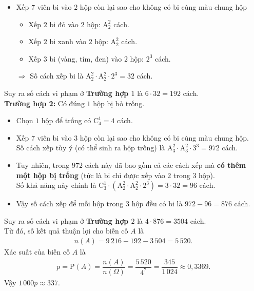 \begin{ex}
{\begin{itemize}
			\item Xếp $7$ viên bi vào $2$ hộp còn lại sao cho không có bi cùng màu chung hộp
			\begin{itemize}
				\item Xếp $2$ bi đỏ vào $2$ hộp: $\mathrm{A}_2^2$ cách.
				\item Xếp $2$ bi xanh vào $2$ hộp: $\mathrm{A}_2^2$ cách.
				\item Xếp $3$ bi (vàng, tím, đen) vào $2$ hộp: $2^3$ cách.
			\end{itemize}
			$\Rightarrow$ Số cách xếp bi là $\mathrm{A}_2^2 \cdot \mathrm{A}_2^2 \cdot 2^3 = 32$ cách.
		\end{itemize}
		Suy ra số cách vi phạm ở \textbf{Trường hợp $1$} là $6 \cdot 32 = 192$ cách.\\
		\textbf{Trường hợp 2:} Có đúng $1$ hộp bị bỏ trống.
		\begin{itemize}
			\item Chọn $1$ hộp để trống có $\mathrm{C}_4^1 = 4$ cách.
			\item Xếp $7$ viên bi vào $3$ hộp còn lại sao cho không có bi cùng màu chung hộp.\\ Số cách xếp tùy ý (có thể sinh ra hộp trống) là $\mathrm{A}_3^2 \cdot \mathrm{A}_3^2 \cdot 3^3 = 972$ cách.
			\item Tuy nhiên, trong $972$ cách này đã bao gồm cả các cách xếp mà \textbf{có thêm một hộp bị trống} (tức là bi chỉ được xếp vào $2$ trong $3$ hộp).\\ Số khả năng này chính là $\mathrm{C}_3^1 \cdot \left(\mathrm{A}_2^2 \cdot \mathrm{A}_2^2 \cdot 2^3\right) = 3 \cdot 32 = 96$ cách.
			\item Vậy số cách xếp để mỗi hộp trong $3$ hộp đều có bi là $972 - 96 = 876$ cách.
		\end{itemize}
		Suy ra số cách vi phạm ở \textbf{Trường hợp $2$} là $4 \cdot 876 = 3 504$ cách.\\
		Từ đó, số kết quả thuận lợi cho biến cố $A$ là
		\begin{align*}
			n(A) = 9\,216 - 192 - 3\,504 = 5\,520. 
		\end{align*}
		Xác suất của biến cố $A$ là
		\begin{align*}
			\mathrm{p} = \mathrm{P}(A) = \dfrac{n(A)}{n(\Omega)} = \dfrac{5\,520}{4^7} = \dfrac{345}{1\,024} \approx 0{,}3369. 
		\end{align*}
		Vậy $1\,000 p \approx 337$.
	}
\end{ex}

\newpage
{}
\label{B\thedeso}